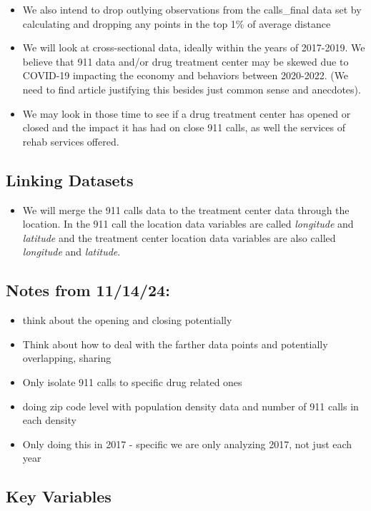 \documentclass[12pt]{article}
\begin{document}
\begin{itemize}
\item We also intend to drop outlying observations from the calls\_final data set by calculating and dropping any points in the top 1\% of average distance
\item We will look at cross-sectional data, ideally within the years of 2017-2019. We believe that 911 data and/or drug treatment center may be skewed due to COVID-19 impacting the economy and behaviors between 2020-2022. (We need to find article justifying this besides just common sense and anecdotes). 
\item We may look in those time to see if a drug treatment center has opened or closed and the impact it has had on close 911 calls, as well the services of rehab services offered. 
\end{itemize}

\subsection{Linking Datasets}
\label{sec:discussion}

\begin{itemize}
    \item We will merge the 911 calls data to the treatment center data through the location. In the 911 call the location data variables are called \textit{longitude} and \textit{latitude} and the treatment center location data variables are also called \textit{longitude} and \textit{latitude}.
\end{itemize}

\subsection{Notes from 11/14/24:}
\begin{itemize}
    \item think about the opening and closing potentially
    \item Think about how to deal with the farther data points and potentially overlapping, sharing
    \item Only isolate 911 calls to specific drug related ones 
    \item doing zip code level with population density data and number of 911 calls in each density
    \item Only doing this in 2017 - specific we are only analyzing 2017, not just each year
\end{itemize}

\subsection{Key Variables}
\label{sec:result}
\end{document}
